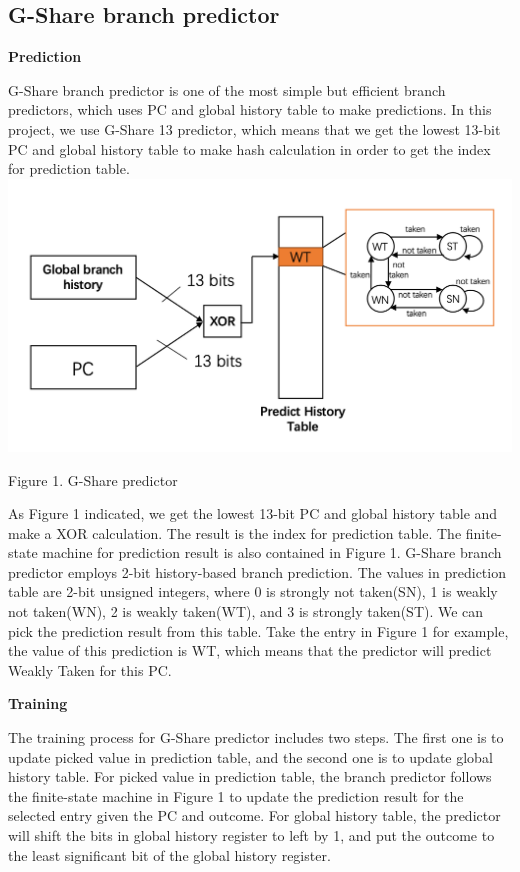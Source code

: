 \documentclass[conference]{IEEEtran}
\begin{document}
\subsection{G-Share branch predictor}
\begin{center}
  \textbf{Prediction}
\end{center}

G-Share branch predictor is one of the most simple but efficient branch predictors, which uses PC and global history table to make predictions. In this project, we use G-Share 13 predictor, which means that 
we get the lowest 13-bit PC and global history table to make hash calculation in order to get the index for prediction table.
\includegraphics[width=\linewidth]{g-share.png}
\begin{center}
  {\small Figure 1. G-Share predictor}
\end{center}

As Figure 1 indicated, we get the lowest 13-bit PC and global history table and make a XOR calculation. The result is the index for prediction table.
The finite-state machine for prediction result is also contained in Figure 1. G-Share branch predictor employs 2-bit 
history-based branch prediction. The values in prediction table are 2-bit unsigned integers, 
where 0 is strongly not taken(SN), 1 is weakly not taken(WN), 2 is weakly taken(WT), and 3 is strongly taken(ST). We can pick the prediction result from this table. 
Take the entry in Figure 1 for example, the value of this prediction is WT, which means that the predictor will predict Weakly Taken for this PC.

\begin{center}
  \textbf{Training}
\end{center}
The training process for G-Share predictor includes two steps. The first one is to update picked value in prediction table, and the second one is to update global history table. 
For picked value in prediction table, the branch predictor follows the finite-state machine in Figure 1 to update the prediction result for the selected entry given the PC and outcome. 
For global history table, the predictor will shift the bits in global history register to left by 1, and put the outcome to the least significant bit of the global history register. 
\end{document}
